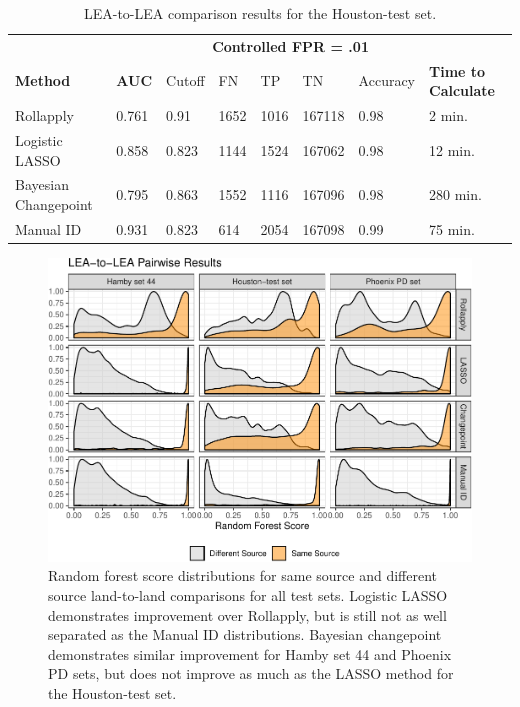 \documentclass[12pt]{article}
\begin{document}
\begin{table}[]
\centering
\begin{tabular}{llllllll}
& & \multicolumn{5}{c}{\textbf{Controlled FPR = .01}} & \\
\textbf{Method} & \textbf{AUC} & Cutoff & FN &TP & TN & Accuracy & \textbf{Time to Calculate} \\ \hline
Rollapply & 0.761 &  0.91 & 1652 & 1016&167118 & 0.98 & 2 min. \\ \hline
Logistic LASSO & 0.858 &  0.823 &1144 &1524 &167062 & 0.98 & 12 min. \\ \hline
Bayesian Changepoint & 0.795 &  0.863 &1552 & 1116&167096 & 0.98 & 280 min. \\ \hline
Manual ID & 0.931 &  0.823 & 614& 2054&167098 & 0.99 & 75 min. \\ \hline 
\end{tabular}
\caption{LEA-to-LEA comparison results for the Houston-test set.}
\label{houston-table}
\end{table}

\begin{figure}
\centering
\includegraphics{writeup_files/figure-latex/all-results-1.pdf}
\caption{\label{houston-groove-results}Random forest score distributions
for same source and different source land-to-land comparisons for all
test sets. Logistic LASSO demonstrates improvement over Rollapply, but
is still not as well separated as the Manual ID distributions. Bayesian
changepoint demonstrates similar improvement for Hamby set 44 and
Phoenix PD sets, but does not improve as much as the LASSO method for
the Houston-test set.}
\end{figure}
\end{document}
